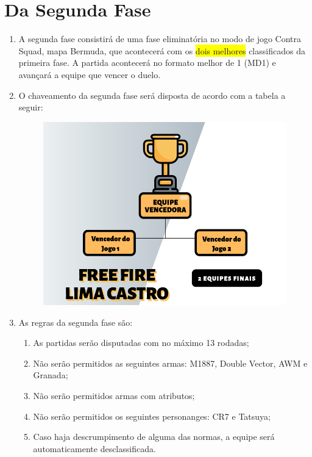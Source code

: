 \section*{Da Segunda Fase}

\begin{enumerate}[start=1,label={\bfseries Art. \arabic*$^\circ$ - }, resume]
    \item A segunda fase consistirá de uma fase eliminatória no modo de jogo
        Contra Squad, mapa Bermuda, que acontecerá com os \colorbox{yellow}{dois melhores} classificados da
        primeira fase. A partida acontecerá no formato melhor de 1 (MD1)
        e avançará a equipe que vencer o duelo.
    \item O chaveamento da segunda fase será disposta de acordo com a tabela
        a seguir:

        \begin{figure}[H]
          \centering
          \includegraphics[width=.9\linewidth]{2-Imagens/bracket.png}
        \end{figure}

    \item As regras da segunda fase são:
        \begin{enumerate}[label={\bfseries \Roman* - }]
            \item As partidas serão disputadas com no máximo 13 rodadas;
            \item Não serão permitidos as seguintes armas: M1887, Double Vector, AWM e Granada;
            \item Não serão permitidos armas com atributos;
            \item Não serão permitidos os seguintes personanges: CR7 e Tatsuya;
            \item  Caso haja descrumpimento de alguma das normas, a equipe será automaticamente desclassificada.
        \end{enumerate}
\end{enumerate}

